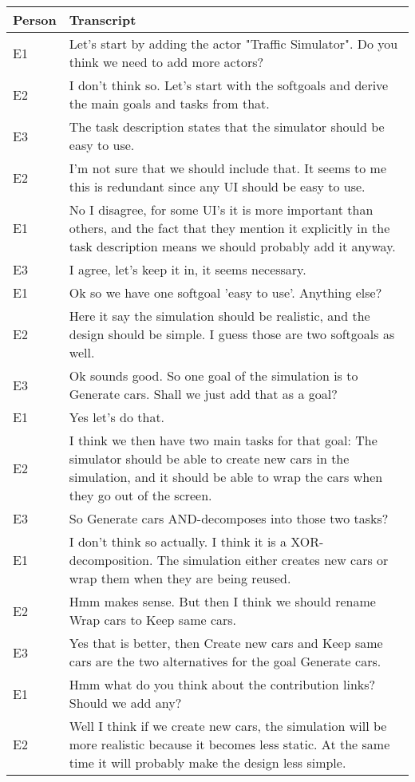 \begin{tabular}{|p{10mm}|p{140mm}|}
\hline
\textbf{Person} & \textbf{Transcript}\\
\hline
E1 & Let's start by adding the actor "Traffic Simulator". Do you think we need to add more actors?\\
\hline
E2 & I don't think so. Let's start with the softgoals and derive the main goals and tasks from that.\\
\hline
E3 & The task description states that the simulator should be easy to use.\\
\hline
E2 & I'm not sure that we should include that. It seems to me this is redundant since any UI should be easy to use.\\
\hline
E1 & No I disagree, for some UI's it is more important than others, and the fact that they mention it explicitly in the task description means we should probably add it anyway.\\
\hline
E3 &I agree, let's keep it in, it seems necessary.\\
\hline
E1 & Ok so we have one softgoal 'easy to use'. Anything else?\\
\hline
E2 & Here it say the simulation should be realistic, and the design should be simple. I guess those are two softgoals as well.\\
\hline
E3 & Ok sounds good. So one goal of the simulation is to Generate cars. Shall we just add that as a goal?\\
\hline
E1 & Yes let's do that.\\
\hline
E2 & I think we then have two main tasks for that goal: The simulator should be able to create new cars in the simulation, and it should be able to wrap the cars when they go out of the screen.\\
\hline
E3 & So Generate cars AND-decomposes into those two tasks?\\
\hline
E1 & I don't think so actually. I think it is a XOR-decomposition. The simulation either creates new cars or wrap them when they are being reused.\\
\hline
E2 & Hmm makes sense. But then I think we should rename Wrap cars to Keep same cars.\\
\hline
E3 & Yes that is better, then Create new cars and Keep same cars are the two alternatives for the goal Generate cars.\\
\hline
E1 & Hmm what do you think about the contribution links? Should we add any?\\
\hline
E2 & Well I think if we create new cars, the simulation will be more realistic because it becomes less static. At the same time it will probably make the design less simple.\\

\end{tabular}

